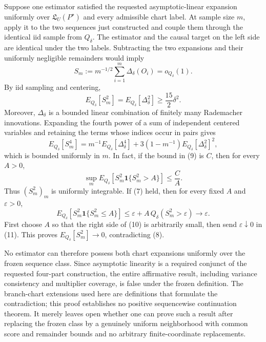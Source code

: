 Suppose one estimator satisfied the requested asymptotic-linear expansion uniformly over \(\mathfrak L_U(P^{\star})\) and every admissible chart label. At sample size \(m\), apply it to the two sequences just constructed and couple them through the identical iid sample from \(Q_\delta\). The estimator and the causal target on the left side are identical under the two labels. Subtracting the two expansions and their uniformly negligible remainders would imply
\[
 S_m:=m^{-1/2}\sum_{i=1}^m\Delta_\delta(O_i)=o_{Q_\delta}(1).
 \tag{7}
\]
By iid sampling and centering,
\[
 E_{Q_\delta}[S_m^2]=E_{Q_\delta}[\Delta_\delta^2]
 \ge\frac{15}{2}\delta^2.
 \tag{8}
\]
Moreover, \(\Delta_\delta\) is a bounded linear combination of finitely many Rademacher innovations. Expanding the fourth power of a sum of independent centered variables and retaining the terms whose indices occur in pairs gives
\[
 E_{Q_\delta}[S_m^4]
 =m^{-1}E_{Q_\delta}[\Delta_\delta^4]
  +3(1-m^{-1})E_{Q_\delta}[\Delta_\delta^2]^2,
 \tag{9}
\]
which is bounded uniformly in \(m\). In fact, if the bound in (9) is \(C\), then for every \(A>0\),
\[
 \sup_m E_{Q_\delta}[S_m^2\mathbf 1\{S_m^2>A\}]
 \le \frac{C}{A}.
 \tag{10}
\]
Thus \((S_m^2)_m\) is uniformly integrable. If (7) held, then for every fixed \(A\) and \(\varepsilon>0\),
\[
 E_{Q_\delta}[S_m^2\mathbf 1\{S_m^2\le A\}]
 \le \varepsilon+A\,Q_\delta(S_m^2>\varepsilon)\longrightarrow\varepsilon.
 \tag{11}
\]
First choose \(A\) so that the right side of (10) is arbitrarily small, then send \(\varepsilon\downarrow0\) in (11). This proves \(E_{Q_\delta}[S_m^2]\to0\), contradicting (8).

No estimator can therefore possess both chart expansions uniformly over the frozen sequence class. Since asymptotic linearity is a required conjunct of the requested four-part construction, the entire affirmative result, including variance consistency and multiplier coverage, is false under the frozen definition. The branch-chart extensions used here are definitions that formulate the contradiction; this proof establishes no positive sequencewise continuation theorem. It merely leaves open whether one can prove such a result after replacing the frozen class by a genuinely uniform neighborhood with common score and remainder bounds and no arbitrary finite-coordinate replacements.
